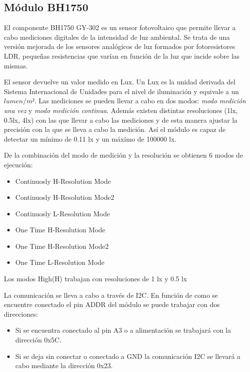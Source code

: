 \subsection{M\'odulo BH1750}\label{subsec:bh1750}
El componente BH1750 GY-302 es un sensor fotovoltaico que permite
llevar a cabo mediciones digitales de la intensidad de luz
ambiental. Se trata de una versi\'on mejorada de los sensores
anal\'ogicos de luz formados por fotoresistores LDR, peque\~nas resistencias que
var\'ian en funci\'on de la luz que incide sobre las mismas.

El sensor devuelve un valor medido en Lux. Un Lux es la unidad
derivada del Sistema Internacional de Unidades para el nivel de
iluminaci\'on y equivale a un $lumen/m²$. Las mediciones se pueden
llevar a cabo en dos modos: \emph{modo medici\'on una vez} y \emph{modo
  medici\'on continua}. Adem\'as existen distintas resoluciones (1lx,
0.5lx, 4lx) con
las que llevar a cabo las mediciones y de esta manera ajustar la
precisi\'on con la que se lleva a cabo la medici\'on. As\'i el m\'odulo es capaz de detectar un
m\'inimo de 0.11 lx y un m\'aximo de 100000 lx. 

De la combinaci\'on del modo de medici\'on y la resoluci\'on se
obtienen 6 modos de ejecuci\'on:
\begin{itemize}
\item Continuosly H-Resolution Mode
\item Continuosly H-Resolution Mode2
\item Continuosly L-Resolution Mode
\item One Time H-Resolution Mode
\item One Time H-Resolution Mode2
\item One Time L-Resolution Mode
\end{itemize}

Los modos High(H) trabajan con resoluciones de 1 lx y 0.5 lx 

La comunicaci\'on se lleva a cabo a trav\'es de I2C. En funci\'on de
como se encuentre conectado el pin ADDR del m\'odulo se puede trabajar
con dos direcciones:
\begin{itemize}
\item Si se encuentra conectado al pin A3 o a alimentaci\'on se
  trabajar\'a con la direcci\'on 0x5C.
\item Si se deja sin conectar o conectado a GND la comunicaci\'on I2C
  se llevar\'a a cabo mediante la direcci\'on 0x23.
\end{itemize}

